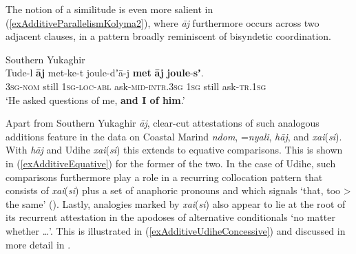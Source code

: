 The notion of a similitude is even more salient in (\ref{exAdditiveParallelismKolyma2}), where  \textit{āj} furthermore occurs across two adjacent clauses, in a pattern broadly reminiscent of bisyndetic coordination.

\begin{exe}
	\ex Southern Yukaghir\label{exAdditiveParallelismKolyma2}\\
	\gll Tude-l \textbf{āj} met-ke-t joule-dʼā-j \textbf{met} \textbf{āj} \textbf{joule}-\textbf{sʼ}.\\
	3\textsc{sg}-\textsc{nom} still 1\textsc{sg}-\textsc{loc}-\textsc{abl} ask-\textsc{mid}-\textsc{intr}.3\textsc{sg} 1\textsc{sg} still ask-\textsc{tr}.1\textsc{sg}\\
	\glt \lq He asked questions of me, \textbf{and I of him}.\rq{ }\parencite[142, 159]{YukaghirTexts}
\end{exe}

Apart from Southern Yukaghir \textit{āj}, clear-cut attestations of such analogous additions feature in the data on Coastal Marind \textit{ndom},  \mbox{=\textit{nyali}},  \textit{hāj}, and  \mbox{\textit{xai}(\textit{si})}. With  \textit{hāj} and Udihe \mbox{\textit{xai}(\textit{si})} this extends to equative comparisons. This is shown in (\ref{exAdditiveEquative}) for the former of the two. In the case of Udihe, such comparisons furthermore play a role  in a recurring collocation pattern that consists of \mbox{\textit{xai}(\textit{si})} plus a set of anaphoric pronouns and which signals  \lq that, too > the same\rq{ }(). Lastly, analogies marked by  \mbox{\textit{xai}(\textit{si})} also appear to lie at the root of its recurrent attestation in the apodoses of alternative  conditionals \lq no matter whether …\rq{}. This is illustrated in (\ref{exAdditiveUdiheConcessive}) and discussed in more detail in . 

